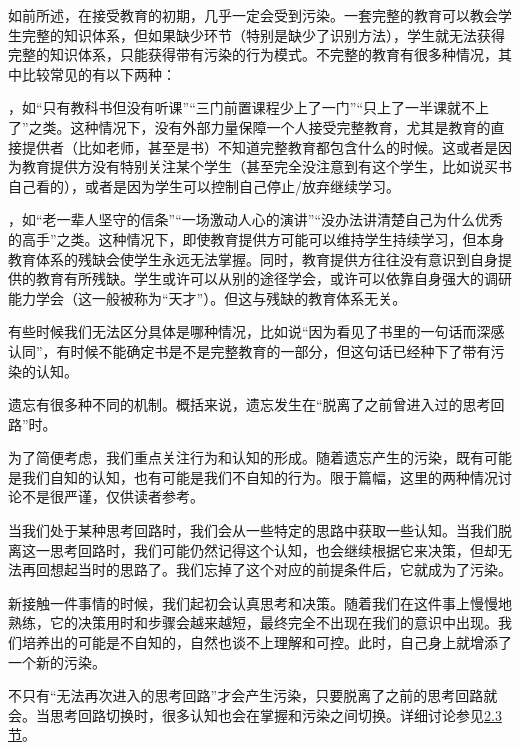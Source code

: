 \begin{explain}
如前所述，在接受教育的初期，几乎一定会受到污染。一套完整的教育可以教会学生完整的知识体系，但如果缺少环节（特别是缺少了识别方法），学生就无法获得完整的知识体系，只能获得带有污染的行为模式。不完整的教育有很多种情况，其中比较常见的有以下两种：

，如“只有教科书但没有听课”“三门前置课程少上了一门”“只上了一半课就不上了”之类。这种情况下，没有外部力量保障一个人接受完整教育，尤其是教育的直接提供者（比如老师，甚至是书）不知道完整教育都包含什么的时候。这或者是因为教育提供方没有特别关注某个学生（甚至完全没注意到有这个学生，比如说买书自己看的），或者是因为学生可以控制自己停止/放弃继续学习。

，如“老一辈人坚守的信条”“一场激动人心的演讲”“没办法讲清楚自己为什么优秀的高手”之类。这种情况下，即使教育提供方可能可以维持学生持续学习，但本身教育体系的残缺会使学生永远无法掌握。同时，教育提供方往往没有意识到自身提供的教育有所残缺。学生或许可以从别的途径学会，或许可以依靠自身强大的调研能力学会（这一般被称为“天才”）。但这与残缺的教育体系无关。

有些时候我们无法区分具体是哪种情况，比如说“因为看见了书里的一句话而深感认同”，有时候不能确定书是不是完整教育的一部分，但这句话已经种下了带有污染的认知。
\end{explain}
\begin{explain}
遗忘有很多种不同的机制。概括来说，遗忘发生在“脱离了之前曾进入过的思考回路”时。

为了简便考虑，我们重点关注行为和认知的形成。随着遗忘产生的污染，既有可能是我们自知的认知，也有可能是我们不自知的行为。限于篇幅，这里的两种情况讨论不是很严谨，仅供读者参考。

当我们处于某种思考回路时，我们会从一些特定的思路中获取一些认知。当我们脱离这一思考回路时，我们可能仍然记得这个认知，也会继续根据它来决策，但却无法再回想起当时的思路了。我们忘掉了这个对应的前提条件后，它就成为了污染。

新接触一件事情的时候，我们起初会认真思考和决策。随着我们在这件事上慢慢地熟练，它的决策用时和步骤会越来越短，最终完全不出现在我们的意识中出现。我们培养出的可能是不自知的，自然也谈不上理解和可控。此时，自己身上就增添了一个新的污染。

不只有“无法再次进入的思考回路”才会产生污染，只要脱离了之前的思考回路就会。当思考回路切换时，很多认知也会在掌握和污染之间切换。详细讨论参见\hyperref[sec:意识与自我]{2.3节}。
\end{explain}
